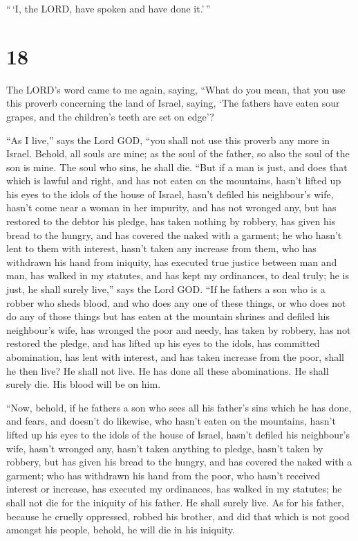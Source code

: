 ``\,`I, the LORD, have spoken and have done it.'\,''

\hypertarget{section-16}{%
\section{18}\label{section-16}}

 The LORD's word came to me again, saying, 
``What do you mean, that you use this proverb concerning the land of
Israel, saying, `The fathers have eaten sour grapes, and the children's
teeth are set on edge'?

 ``As I live,'' says the Lord GOD, ``you shall not use
this proverb any more in Israel.  Behold, all souls are
mine; as the soul of the father, so also the soul of the son is mine.
The soul who sins, he shall die.  ``But if a man is just,
and does that which is lawful and right,  and has not
eaten on the mountains, hasn't lifted up his eyes to the idols of the
house of Israel, hasn't defiled his neighbour's wife, hasn't come near a
woman in her impurity,  and has not wronged any, but has
restored to the debtor his pledge, has taken nothing by robbery, has
given his bread to the hungry, and has covered the naked with a garment;
 he who hasn't lent to them with interest, hasn't taken
any increase from them, who has withdrawn his hand from iniquity, has
executed true justice between man and man,  has walked in
my statutes, and has kept my ordinances, to deal truly; he is just, he
shall surely live,'' says the Lord GOD.  ``If he fathers
a son who is a robber who sheds blood, and who does any one of these
things,  or who does not do any of those things but has
eaten at the mountain shrines and defiled his neighbour's wife,
 has wronged the poor and needy, has taken by robbery,
has not restored the pledge, and has lifted up his eyes to the idols,
has committed abomination,  has lent with interest, and
has taken increase from the poor, shall he then live? He shall not live.
He has done all these abominations. He shall surely die. His blood will
be on him.

 ``Now, behold, if he fathers a son who sees all his
father's sins which he has done, and fears, and doesn't do likewise,
 who hasn't eaten on the mountains, hasn't lifted up his
eyes to the idols of the house of Israel, hasn't defiled his neighbour's
wife,  hasn't wronged any, hasn't taken anything to
pledge, hasn't taken by robbery, but has given his bread to the hungry,
and has covered the naked with a garment;  who has
withdrawn his hand from the poor, who hasn't received interest or
increase, has executed my ordinances, has walked in my statutes; he
shall not die for the iniquity of his father. He shall surely live.
 As for his father, because he cruelly oppressed, robbed
his brother, and did that which is not good amongst his people, behold,
he will die in his iniquity.

